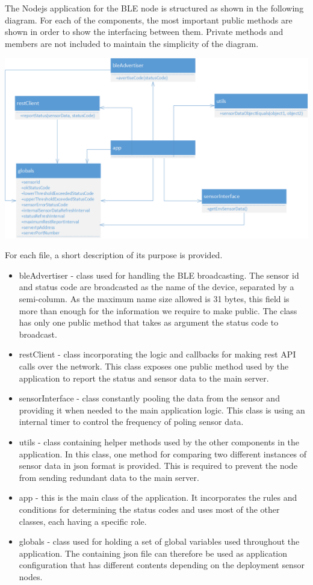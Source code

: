 The Nodejs application for the BLE node is structured as shown in the following diagram. For each of the components, the most important public methods are shown in order to show the interfacing between them. Private methods and members are not included to maintain the simplicity of the diagram.

\bigskip
\includegraphics[scale=0.6]{gfx/bleNode_Architecture} 
\bigskip

For each file, a short description of its purpose is provided.
\begin{itemize}
\item bleAdvertiser - class used for handling the BLE broadcasting. The sensor id and status code are broadcasted as the name of the device, separated by a semi-column. As the maximum name size allowed is 31 bytes, this field is more than enough for the information we require to make public. The class has only one public method that takes as argument the status code to broadcast.
\item restClient - class incorporating the logic and callbacks for making rest API calls over the network. This class exposes one public method used by the application to report the status and sensor data to the main server.
\item sensorInterface - class constantly pooling the data from the sensor and providing it when needed to the main application logic. This class is using an internal timer to control the frequency of poling sensor data.
\item utils - class containing helper methods used by the other components in the application. In this class, one method for comparing two different instances of sensor data in json format is provided. This is required to prevent the node from sending redundant data to the main server.
\item app - this is the main class of the application. It incorporates the rules and conditions for determining the status codes and uses most of the other classes, each having a specific role.
\item globals - class used for holding a set of global variables used throughout the application. The containing json file can therefore be used as application configuration that has different contents depending on the deployment sensor nodes.
\end{itemize}

